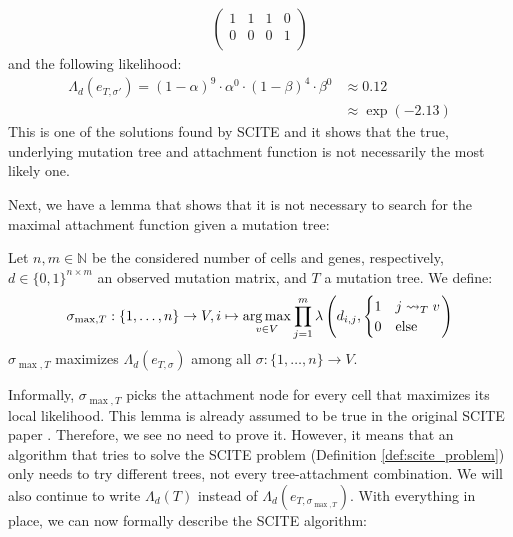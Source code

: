 \begin{example}
\begin{align*}
\begin{pmatrix}
            1 & 1 & 1 & 0 \\
            0 & 0 & 0 & 1 \\
        \end{pmatrix}
    \end{align*}
    and the following likelihood:
    \begin{align*}
        \Lambda_d(e_{T, \sigma'}) = (1-\alpha)^{9} \cdot \alpha^{0} \cdot (1-\beta)^{4} \cdot \beta^{0} &\approx 0.12 \\
        &\approx \exp(-2.13) 
    \end{align*}
    This is one of the solutions found by \ac{SCITE} and it shows that the true, underlying mutation tree and attachment function is not necessarily the most likely one.
\end{example}

Next, we have a lemma that shows that it is not necessary to search for the maximal attachment function given a mutation tree:

\begin{lemma}
    \label{lem:max_attachment}
    Let $n, m \in \mathbb{N}$ be the considered number of cells and genes, respectively, $d \in \{0,1\}^{n \times m}$ an observed mutation matrix, and $T$ a mutation tree. We define:
    \begin{align*}
        \sigma_{\max, T}: \{1, \dots, n\} \rightarrow V, i \mapsto \operatorname*{arg\,max}_{v \in V} \prod_{j = 1}^m \lambda \left(d_{i,j}, \begin{cases}
            1 & j \leadsto_T v \\
            0 & \mathrm{else} \\
        \end{cases}\right)
    \end{align*}
    $\sigma_{\max, T}$ maximizes $\Lambda_d (e_{T, \sigma})$ among all $\sigma: \{1, \dots, n\} \rightarrow V$.
\end{lemma}

Informally, $\sigma_{\max, T}$ picks the attachment node for every cell that maximizes its local likelihood. This lemma is already assumed to be true in the original SCITE paper \cite{tree2016}. Therefore, we see no need to prove it. However, it means that an algorithm that tries to solve the \ac{SCITE} problem (Definition \ref{def:scite_problem}) only needs to try different trees, not every tree-attachment combination. We will also continue to write $\Lambda_d(T)$ instead of $\Lambda_d(e_{T, \sigma_{\max, T}})$. With everything in place, we can now formally describe the \ac{SCITE} algorithm:

